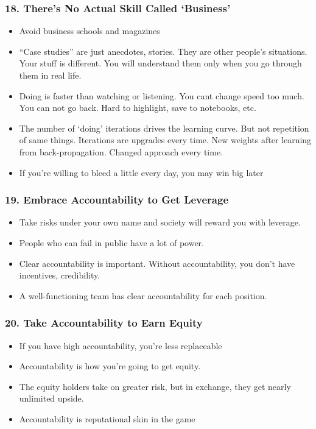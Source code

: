 \begin{frame}[fragile]
\frametitle{18. There’s No Actual Skill Called `Business'}
\begin{itemize}
\item Avoid business schools and magazines
\item ``Case studies'' are just anecdotes, stories. They are other people's situations. Your stuff is different. You will understand them only when you go through them in real life.
\item Doing is faster than watching or listening. You cant change speed too much. You can not go back. Hard to highlight, save to notebooks, etc.
\item The number of `doing' iterations drives the learning curve. But not repetition of same things. Iterations are upgrades every time. New weights after learning from back-propagation. Changed approach every time.
\item If you're willing to bleed a little every day, you may win big later
\end{itemize}
\end{frame}


\begin{frame}[fragile]
\frametitle{19. Embrace Accountability to Get Leverage}
\begin{itemize}
\item Take risks under your own name and society will reward you with leverage.
\item People who can fail in public have a lot of power.
\item Clear accountability is important. Without accountability, you don’t have incentives, credibility.
\item A well-functioning team has clear accountability for each position.
\end{itemize}
\end{frame}


\begin{frame}[fragile]
\frametitle{20. Take Accountability to Earn Equity}
\begin{itemize}
\item If you have high accountability, you're less replaceable
\item Accountability is how you're going to get equity.
\item The equity holders take on greater risk, but in exchange, they get nearly unlimited upside.
\item Accountability is reputational skin in the game
\end{itemize}
\end{frame}

